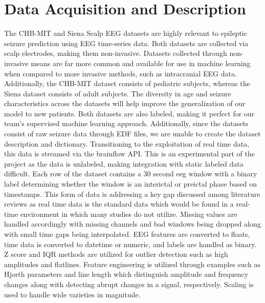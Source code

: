 \documentclass[conference]{IEEEtran}
\begin{document}
\section{Data Acquisition and Description}
\noindent The CHB-MIT and Siena Scalp EEG datasets are highly relevant to epileptic seizure prediction using EEG time-series data. Both datasets are collected via scalp electrodes, making them non-invasive. Datasets collected through non-invasive means are far more common and available for use in machine learning when compared to more invasive methods, such as intracranial EEG data. Additionally, the CHB-MIT dataset consists of pediatric subjects, whereas the Siena dataset consists of adult subjects. The diversity in age and seizure characteristics across the datasets will help improve the generalization of our model to new patients. Both datasets are also labeled, making it perfect for our team's supervised machine learning approach. Additionally, since the datasets consist of raw seizure data through EDF files, we are unable to create the dataset description and dictionary. Transitioning to the exploitation of real time data, this data is streamed via the brainflow API. This is an experimental part of the project as the data is unlabeled, making integration with static labeled data difficult. Each row of the dataset contains a 30 second eeg window with a binary label determining whether the window is an interictal or preictal phase based on timestamps. This form of data is addressing a key gap discussed among literature reviews as real time data is the standard data which would be found in a real-time environment in which many studies do not utilize. Missing values are handled accordingly with missing channels and bad windows being dropped along with small time gaps being interpolated. EEG features are converted to floats, time data is converted to datetime or numeric, and labels are handled as binary. Z score and IQR methods are utilized for outlier detection such as high amplitudes and flatlines. Feature engineering is utilized through examples such as Hjorth parameters and line length which distinguish amplitude and frequency changes along with detecting abrupt changes in a signal, respectively. Scaling is used to handle wide varieties in magnitude. 
\printbibliography
\end{document}
